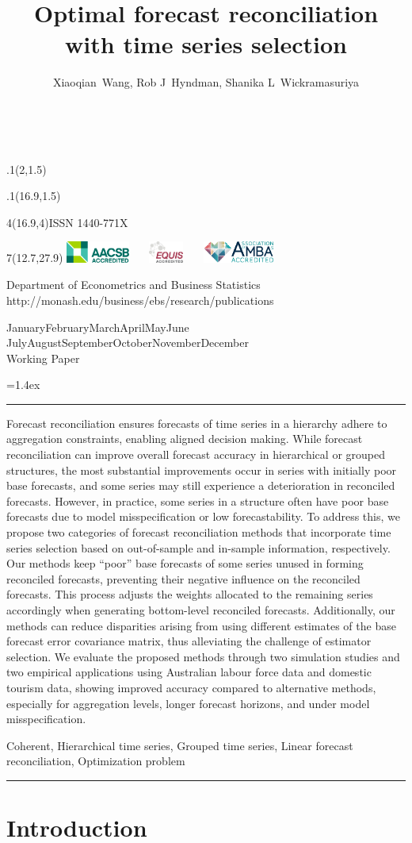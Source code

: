 \documentclass[11pt,a4paper,]{article}
\title{Optimal forecast reconciliation with time series selection}
\author{Xiaoqian~Wang, Rob J~Hyndman, Shanika L~Wickramasuriya}
\date{\sf\Date~\Month~\Year}
\makeatletter
\def\Date{\number\day}
\def\Month{\ifcase\month\or
 January\or February\or March\or April\or May\or June\or
 July\or August\or September\or October\or November\or December\fi}
\def\Year{\number\year}
\def\showjel{{\large\textsf{\textbf{JEL classification:}}~\@jel}}
\def\cover{{\sffamily\setcounter{page}{0}
        \thispagestyle{empty}
        \placefig{2}{1.5}{width=5cm}{_extensions/wp/monash2}
        \placefig{16.9}{1.5}{width=2.1cm}{_extensions/wp/MBSportrait}
        \begin{textblock}{4}(16.9,4)ISSN 1440-771X\end{textblock}
        \begin{textblock}{7}(12.7,27.9)\hfill
        \includegraphics[height=0.7cm]{_extensions/wp/AACSB}~~~
        \includegraphics[height=0.7cm]{_extensions/wp/EQUIS}~~~
        \includegraphics[height=0.7cm]{_extensions/wp/AMBA}
        \end{textblock}
        \vspace*{2cm}
        \begin{center}\Large
        Department of Econometrics and Business Statistics\\[.5cm]
        \footnotesize http://monash.edu/business/ebs/research/publications
        \end{center}\vspace{2cm}
        \begin{center}
        \fbox{\parbox{14cm}{\begin{onehalfspace}\centering\Huge\vspace*{0.3cm}
                \textsf{\textbf{\expandafter{\@title}}}\vspace{1cm}\par
                \LARGE\@author\end{onehalfspace}
        }}
        \end{center}
        \vfill
                \begin{center}\Large
                \Month~\Year\\[1cm]
                Working Paper \@wp
        \end{center}\vspace*{2cm}}}
\def\pageone{{\sffamily\setstretch{1}%
        \thispagestyle{empty}%
        \vbox to \textheight{%
        \raggedright\baselineskip=1.2cm
     {\fontsize{24.88}{30}\sffamily\textbf{\expandafter{\@title}}}
        \vspace{2cm}\par
        \hspace{1cm}\parbox{14cm}{\sffamily\large\@addresses}\vspace{1cm}\vfill
        \hspace{1cm}{\large\Date~\Month~\Year}\\[1cm]
        \hspace{1cm}\showjel\vss}}}
\def\blindtitle{{\sffamily
     \thispagestyle{plain}\raggedright\baselineskip=1.2cm
     {\fontsize{24.88}{30}\sffamily\textbf{\expandafter{\@title}}}\vspace{1cm}\par
        }}
\def\titlepage{{\cover\newpage\pageone\newpage\blindtitle}}
\let\maketitle\titlepage
\newenvironment{keywords}{\par\vspace{0.5cm}\noindent{\sffamily\textbf{Keywords:}}}{\vspace{0.25cm}\par\hrule\vspace{0.5cm}\par}
\renewenvironment{abstract}{\begin{minipage}{\textwidth}\parskip=1.4ex\noindent
\hrule\vspace{0.1cm}\par{\sffamily\textbf{\abstractname}}\newline}
  {\end{minipage}}
\def\placefig#1#2#3#4{\begin{textblock}{.1}(#1,#2)\rlap{\texttt{[image: \#4]}}\end{textblock}}
\makeatother
\begin{document}
\maketitle
\begin{abstract}
Forecast reconciliation ensures forecasts of time series in a hierarchy
adhere to aggregation constraints, enabling aligned decision making.
While forecast reconciliation can improve overall forecast accuracy in
hierarchical or grouped structures, the most substantial improvements
occur in series with initially poor base forecasts, and some series may
still experience a deterioration in reconciled forecasts. However, in
practice, some series in a structure often have poor base forecasts due
to model misspecification or low forecastability. To address this, we
propose two categories of forecast reconciliation methods that
incorporate time series selection based on out-of-sample and in-sample
information, respectively. Our methods keep ``poor'' base forecasts of
some series unused in forming reconciled forecasts, preventing their
negative influence on the reconciled forecasts. This process adjusts the
weights allocated to the remaining series accordingly when generating
bottom-level reconciled forecasts. Additionally, our methods can reduce
disparities arising from using different estimates of the base forecast
error covariance matrix, thus alleviating the challenge of estimator
selection. We evaluate the proposed methods through two simulation
studies and two empirical applications using Australian labour force
data and domestic tourism data, showing improved accuracy compared to
alternative methods, especially for aggregation levels, longer forecast
horizons, and under model misspecification.
\end{abstract}
\begin{keywords}
Coherent, Hierarchical time series, Grouped time series, Linear forecast
reconciliation, Optimization problem
\end{keywords}

\ifdefined\Shaded\renewenvironment{Shaded}{\begin{tcolorbox}[interior hidden, borderline west={3pt}{0pt}{shadecolor}, breakable, frame hidden, boxrule=0pt, sharp corners, enhanced]}{\end{tcolorbox}}\fi

\hypertarget{sec-introduction}{%
\section{Introduction}\label{sec-introduction}}
\end{document}
